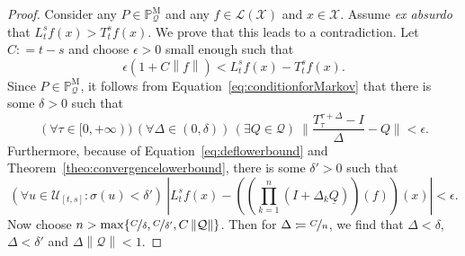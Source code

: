\documentclass[a4paper,reqno]{amsart}
\newcommand{\states}{\mathcal{X}}
\newcommand{\processes}{\mathbb{P}}
\newcommand{\mprocesses}{\processes^{\mathrm{M}}}
\newcommand{\lbound}{L}
\newcommand{\gambles}{\mathcal{L}}
\newcommand{\gamblesX}{\gambles(\states)}
\newcommand{\rateset}{\mathcal{Q}}
\newcommand{\lrate}{\underline{Q}}
\newcommand{\norm}[1]{\left\lVert #1 \right\rVert}
\newcommand{\abs}[1]{\left\vert #1 \right\vert}
\newcommand{\coloneqq}{:\!=}
\begin{document}
\begin{proof}
Consider any $P\in\mprocesses_\rateset$ and any $f\in\gamblesX$ and $x\in\states$. Assume \emph{ex absurdo} that $\lbound_t^sf(x)>T_t^sf(x)$. We prove that this leads to a contradiction.  Let $C\coloneqq t-s$ and choose $\epsilon>0$ small enough such that
\begin{equation}\label{eq:chooseepsilon}
\epsilon(1+C\norm{f})<\lbound_t^sf(x)-T_t^sf(x).
\end{equation}
Since $P\in\mprocesses_\rateset$, it follows from Equation~\eqref{eq:conditionforMarkov} that there is some $\delta>0$ such that
\begin{equation}\label{eq:1conditionforMarkov}
(\forall \tau\in[0,+\infty))\,
(\forall\Delta\in(0,\delta))\,
(\exists Q\in\rateset)~
\Big\lVert\frac{T_\tau^{\tau+\Delta}-I}{\Delta}-Q\Big\rVert<\epsilon.
\end{equation}
Furthermore, because of Equation~\eqref{eq:deflowerbound} and Theorem~\ref{theo:convergencelowerbound}, there is some $\delta'>0$ such that
\begin{equation}\label{eq:deltaprimeformula}
(\forall u\in\mathcal{U}_{[t,s]}\colon\sigma(u)<\delta')~\abs{\lbound_t^sf(x) - \left(\left(\prod_{k=1}^n(I+\Delta_k\lrate)\right)(f)\right)(x)}<\epsilon.
\end{equation}
Now choose $n>\max\{\nicefrac{C}{\delta},\nicefrac{C}{\delta'},C\norm{\rateset}\}$. Then for $\Delta\coloneqq\nicefrac{C}{n}$, we find that $\Delta<\delta$, $\Delta<\delta'$ and $\Delta\norm{\rateset}<1$. 


\end{proof}
\end{document}
